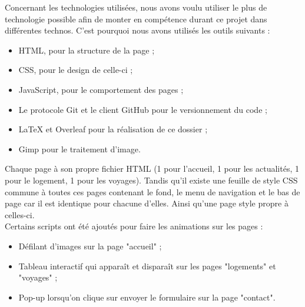 Concernant les technologies utilisées, nous avons voulu utiliser le plus de technologie possible afin de monter en compétence durant ce projet dans différentes technos. C'est pourquoi nous avons utilisés les outils suivants : 
\begin{itemize}
    \item HTML, pour la structure de la page ;
    \item CSS, pour le design de celle-ci ;
    \item JavaScript, pour le comportement des pages ;
    \item Le protocole Git et le client GitHub pour le versionnement du code ;
    \item LaTeX et Overleaf pour la réalisation de ce dossier ;
    \item Gimp pour le traitement d'image.
\end{itemize}
\vspace{1\baselineskip}

Chaque page à son propre fichier HTML (1 pour l'accueil, 1 pour les actualités, 1 pour le logement, 1 pour les voyages). 
Tandis qu'il existe une feuille de style CSS commune à toutes ces pages contenant le fond, le menu de navigation et le bas de page car il est identique pour chacune d'elles. 
Ainsi qu'une page style propre à celles-ci.      \\

Certains scripts ont été ajoutés pour faire les animations sur les pages : \begin{itemize}
    \item Défilant d'images sur la page "accueil" ;
    \item Tableau interactif qui apparaît et disparaît sur les pages "logements" et "voyages" ;
    \item Pop-up lorsqu'on clique sur envoyer le formulaire sur la page "contact".
\end{itemize}


